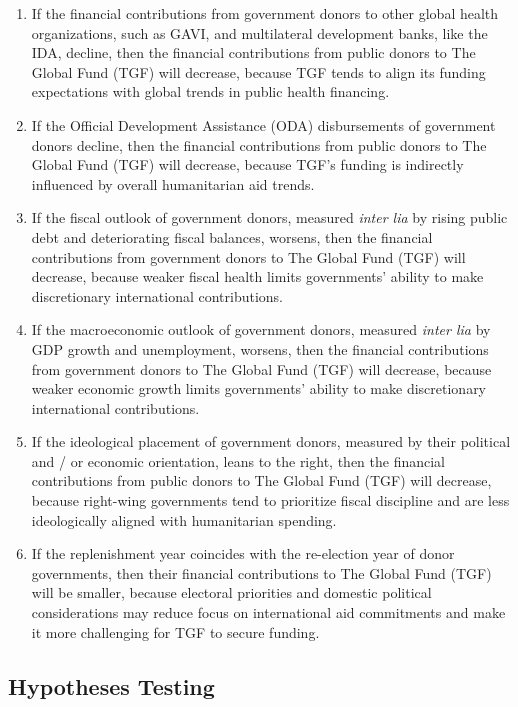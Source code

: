 \documentclass[
]{article}
\providecommand{\tightlist}{%
  \setlength{\itemsep}{0pt}\setlength{\parskip}{0pt}}
\begin{document}
\begin{enumerate}
\def\labelenumi{\arabic{enumi}.}
\tightlist
\item
  If the financial contributions from government donors to other global
  health organizations, such as GAVI, and multilateral development
  banks, like the IDA, decline, then the financial contributions from
  public donors to The Global Fund (TGF) will decrease, because TGF
  tends to align its funding expectations with global trends in public
  health financing.
\item
  If the Official Development Assistance (ODA) disbursements of
  government donors decline, then the financial contributions from
  public donors to The Global Fund (TGF) will decrease, because TGF's
  funding is indirectly influenced by overall humanitarian aid trends.
\item
  If the fiscal outlook of government donors, measured \emph{inter lia}
  by rising public debt and deteriorating fiscal balances, worsens, then
  the financial contributions from government donors to The Global Fund
  (TGF) will decrease, because weaker fiscal health limits governments'
  ability to make discretionary international contributions.
\item
  If the macroeconomic outlook of government donors, measured
  \emph{inter lia} by GDP growth and unemployment, worsens, then the
  financial contributions from government donors to The Global Fund
  (TGF) will decrease, because weaker economic growth limits
  governments' ability to make discretionary international
  contributions.
\item
  If the ideological placement of government donors, measured by their
  political and / or economic orientation, leans to the right, then the
  financial contributions from public donors to The Global Fund (TGF)
  will decrease, because right-wing governments tend to prioritize
  fiscal discipline and are less ideologically aligned with humanitarian
  spending.
\item
  If the replenishment year coincides with the re-election year of donor
  governments, then their financial contributions to The Global Fund
  (TGF) will be smaller, because electoral priorities and domestic
  political considerations may reduce focus on international aid
  commitments and make it more challenging for TGF to secure funding.
\end{enumerate}

\subsection{Hypotheses Testing}\label{hypotheses-testing}
\end{document}
